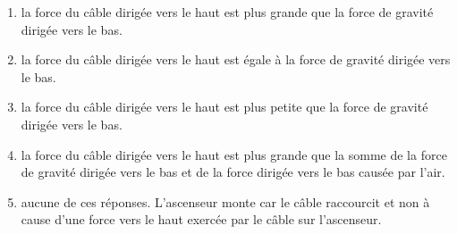 \documentclass{beamer}
\begin{document}
\begin{frame}
  \begin{enumerate}
    \item la force du câble dirigée vers le haut est plus grande que la force de
      gravité dirigée vers le bas.
    \item la force du câble dirigée vers le haut est égale à la force de gravité
      dirigée vers le bas.
    \item la force du câble dirigée vers le haut est plus petite que la force de
      gravité dirigée vers le bas.
    \item la force du câble dirigée vers le haut est plus grande que la somme de
      la force de gravité dirigée vers le bas et de la force dirigée vers le bas
      causée par l'air.
    \item aucune de ces réponses. L’ascenseur monte car le câble raccourcit et
      non à cause d'une force vers le haut exercée par le câble sur l'ascenseur.
  \end{enumerate}
\end{frame}
\end{document}
